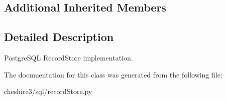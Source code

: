 \subsection*{Additional Inherited Members}


\subsection{Detailed Description}
\begin{DoxyVerb}PostgreSQL RecordStore implementation.\end{DoxyVerb}
 

The documentation for this class was generated from the following file\-:\begin{DoxyCompactItemize}
\item 
cheshire3/sql/record\-Store.\-py\end{DoxyCompactItemize}
